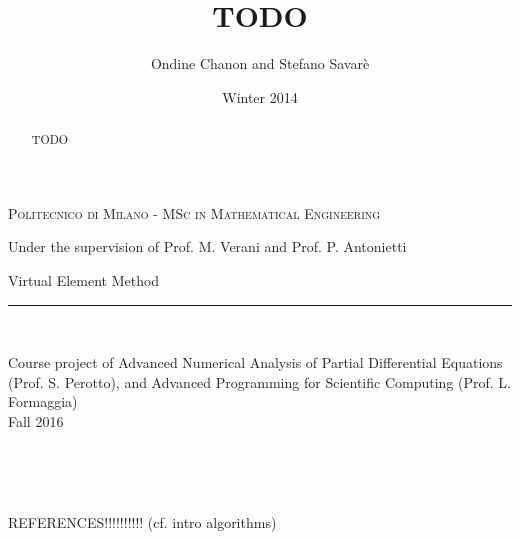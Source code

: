 \documentclass[letter,11pt]{article}
\title{TODO} %
\author{Ondine Chanon and Stefano Savarè} %
\date{Winter 2014}
\begin{document}
\begin{titlepage}


\begin{center}
\textsc{Politecnico di Milano - MSc in Mathematical Engineering}

Under the supervision of Prof. M. Verani and Prof. P. Antonietti
\end{center}

\vfill


\begin{center}
\begin{Huge}
Virtual Element Method\\ 
\vspace{3mm}
\end{Huge}
\end{center}

\noindent\rule{\linewidth}{2pt}

\vspace{5mm}


~\vspace{1cm}


\vfill

\begin{center}
Course project of Advanced Numerical Analysis
of Partial Differential Equations (Prof. S. Perotto), and Advanced Programming for Scientific Computing (Prof. L. Formaggia)\\
\vspace{1cm}
Fall 2016
\end{center}

\end{titlepage}

~\vfill
\thispagestyle{empty}
\begin{abstract}
TODO
\end{abstract}

\vfill 

\tableofcontents

~\vfill

%








%


\vfill


REFERENCES!!!!!!!!!! (cf. intro algorithms)
\end{document}
